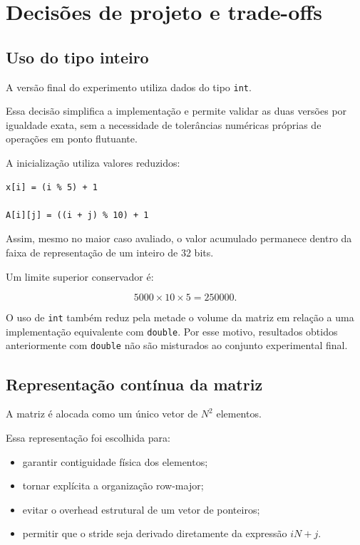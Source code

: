 
\section{Decisões de projeto e trade-offs}

\label{sec:atvd01-decisoes}

\subsection{Uso do tipo inteiro}

A versão final do experimento utiliza dados do tipo \texttt{int}.

Essa decisão simplifica a implementação e permite validar as duas versões
por igualdade exata, sem a necessidade de tolerâncias numéricas próprias
de operações em ponto flutuante.

A inicialização utiliza valores reduzidos:

\begin{verbatim}
x[i] = (i % 5) + 1

A[i][j] = ((i + j) % 10) + 1
\end{verbatim}

Assim, mesmo no maior caso avaliado, o valor acumulado permanece dentro
da faixa de representação de um inteiro de 32 bits.

Um limite superior conservador é:

\begin{equation}
    5000 \times 10 \times 5
    =
    250000.
\end{equation}

O uso de \texttt{int} também reduz pela metade o volume da matriz em
relação a uma implementação equivalente com \texttt{double}. Por esse
motivo, resultados obtidos anteriormente com \texttt{double} não são
misturados ao conjunto experimental final.


\subsection{Representação contínua da matriz}

A matriz é alocada como um único vetor de \(N^2\) elementos.

Essa representação foi escolhida para:

\begin{itemize}

    \item garantir contiguidade física dos elementos;

    \item tornar explícita a organização row-major;

    \item evitar o overhead estrutural de um vetor de ponteiros;

    \item permitir que o stride seja derivado diretamente da expressão
    \(iN+j\).

\end{itemize}


